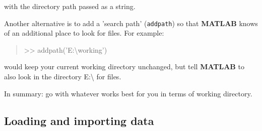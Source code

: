 \documentclass{tufte-book} %
\newenvironment{docspec}{\begin{quotation}\ttfamily\parskip0pt\parindent0pt\ignorespaces}{\end{quotation}}
\begin{document}
with the directory path passed as a string.

Another alternative is to add a 'search path' (\texttt{addpath}) so that \textbf{MATLAB} knows of an additional place to look for files.  For example:
\begin{docspec}
>> addpath('E:\textbackslash working')
\end{docspec}
would keep your current working directory unchanged, but tell \textbf{MATLAB} to also look in the directory \textsf{E:\textbackslash} for files.

In summary: go with whatever works best for you in terms of working directory.


\subsection{Loading and importing data}
\end{document}
